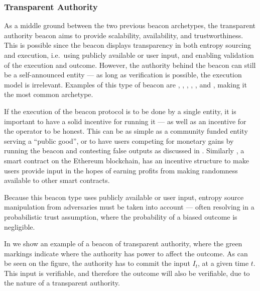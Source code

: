 \subsubsection{Transparent Authority}\label{ssub:transparent_authority}
As a middle ground between the two previous beacon archetypes, the transparent authority beacon aims to provide scalability, availability, and trustworthiness.
This is possible since the beacon displays transparency in both entropy sourcing and execution, i.e.\ using publicly available or user input, and enabling validation of the execution and outcome. 
However, the authority behind the beacon can still be a self-announced entity --- as long as verification is possible, the execution model is irrelevant.
Examples of this type of beacon are , , , , ,  and , making it the most common archetype. 

If the execution of the beacon protocol is to be done by a single entity, it is important to have a solid incentive for running it --- as well as an incentive for the operator to be honest. 
This can be as simple as a community funded entity serving a \enquote{public good}, or to have users competing for monetary gains by running the beacon and contesting false outputs as discussed in \citet{bunz2017proofsof}. 
Similarly , a smart contract on the Ethereum blockchain, has an incentive structure to make users provide input in the hopes of earning profits from making randomness available to other smart contracts. 

Because this beacon type uses publicly available or user input, entropy source manipulation from adversaries must be taken into account --- often resolving in a probabilistic trust assumption, where the probability of a biased outcome is negligible.


In  we show an example of a beacon of transparent authority, where the green markings indicate where the authority has power to affect the outcome.
As can be seen on the figure, the authority has to commit the input $I_t$, at a given time $t$.
This input is verifiable, and therefore the outcome will also be verifiable, due to the nature of a transparent authority.


